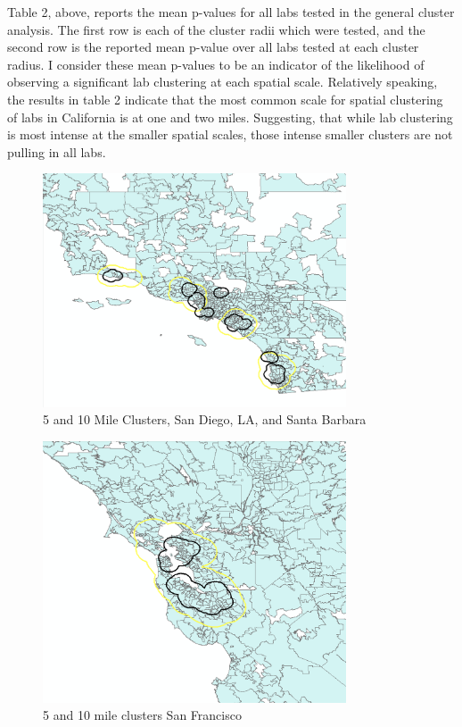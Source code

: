 \documentclass[12pt,letterpaper]{article}
\begin{document}
\begin{table}[H]
\centering
{}
\caption{}
\label{tab:2}
\end{table}
Table 2, above, reports the mean p-values for all labs tested in the general cluster analysis. The first row is each of the cluster radii which were tested, and the second row is the reported mean p-value over all labs tested at each cluster radius. I consider these mean p-values to be an indicator of the likelihood of observing a significant lab clustering at each spatial scale. Relatively speaking, the results in table 2 indicate that the most common scale for spatial clustering of labs in California is at one and two miles. Suggesting, that while lab clustering is most intense at the smaller spatial scales, those intense smaller clusters are not pulling in all labs. 
\begin{figure}[H]
    \centering
    \includegraphics[width=9cm]{LA.png}
    \caption{5 and 10 Mile Clusters, San Diego, LA, and Santa Barbara}
    \label{fig:lab1}
\end{figure}
\begin{figure}[H]
    \centering
    \includegraphics[width=9cm]{SF.png}
    \caption{5 and 10 mile clusters San Francisco}
    \label{fig:lab2}
\end{figure}
\end{document}
